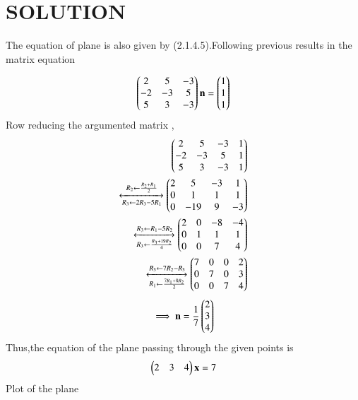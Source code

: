 \documentclass[journal,12pt,twocolumn]{IEEEtran}
\begin{document}
\section{SOLUTION} 
The equation of plane is also given by (2.1.4.5).Following previous results in the matrix equation
\begin{enumerate}
\begin{align}
\begin{pmatrix}2 & 5 & -3\\-2 & -3 & 5\\5 & 3 & -3\end{pmatrix} \mathbf{n} = \begin{pmatrix}1\\1\\1\end{pmatrix}
\end{align}
Row reducing the argumented matrix ,
\begin{align}
\begin{pmatrix}2 & 5 & -3 & 1\\-2 & -3 & 5 & 1\\5 & 3 & -3 & 1\end{pmatrix}\\ 
\xleftrightarrow[R_3\leftarrow 2R_3-5R_1]{R_2\leftarrow \frac{R_2+R_1}{2}}\begin{pmatrix}2 & 5 & -3 & 1\\0 & 1 & 1 & 1\\0 & -19 & 9 & -3\end{pmatrix}
\\
\xleftrightarrow[R_3\leftarrow \frac{R_3+19R_2}{4}]{R_3\leftarrow R_1-5R_2}\begin{pmatrix}2 & 0 & -8 & -4\\0 & 1 & 1 & 1\\0 & 0 & 7 & 4\end{pmatrix}
\\
\xleftrightarrow[R_1\leftarrow \frac{7R_1+8R_2}{2}]{R_3\leftarrow 7R_2-R_3}\begin{pmatrix}7& 0& 0 & 2\\0 & 7 & 0 & 3\\0 & 0  & 7 & 4\end{pmatrix}
\end{align}
\begin{align}
\implies \mathbf{n} = \frac{1}{7}\begin{pmatrix}2\\3\\4\end{pmatrix}
\end{align}
Thus,the equation of the plane passing through the given points is 
\begin{align}
\begin{pmatrix}2 & 3 & 4\end{pmatrix}\mathbf{x} = 7  
\end{align}
Plot of the plane 

\end{enumerate}
\end{document}
